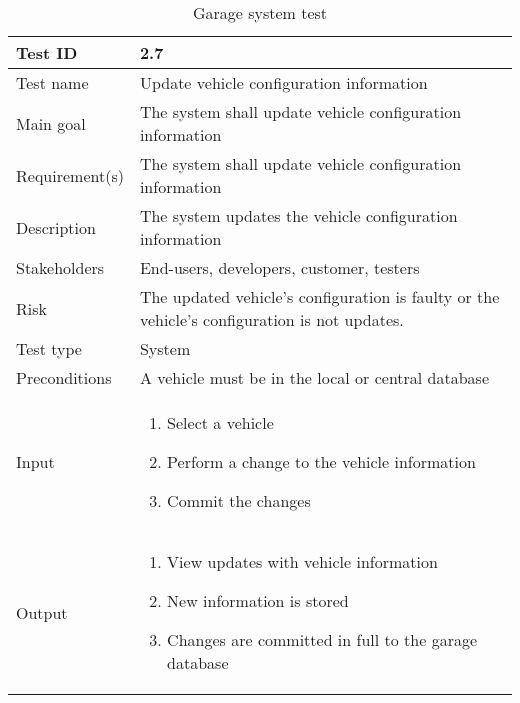 \begin{table}[H]
\centering
\caption{Garage system test}
\begin{tabularx}{1.0\textwidth}{
    |p{}     %
    |p{}|    %
}
\hline

Test ID
& 2.7
\\
\hline

Test name
& Update vehicle configuration information
\\
\hline

Main goal
& The system shall update vehicle configuration information
\\
\hline

Requirement(s)
& The system shall update vehicle configuration information
\\
\hline

Description
& The system updates the vehicle configuration information
\\
\hline

Stakeholders
& End-users, developers, customer, testers
\\
\hline

Risk
& The updated vehicle's configuration is faulty or the vehicle's configuration is not updates.
\\
\hline

Test type
& System
\\
\hline

Preconditions
& A vehicle must be in the local or central database
\\
\hline

Input
& \begin{enumerate}
    \item Select a vehicle
    \item Perform a change to the vehicle information
    \item Commit the changes
\end{enumerate}
\\
\hline

Output
& \begin{enumerate}
    \item View updates with vehicle information
    \item New information is stored
    \item Changes are committed in full to the garage database
\end{enumerate}
\\
\hline


\end{tabularx}
\end{table}
